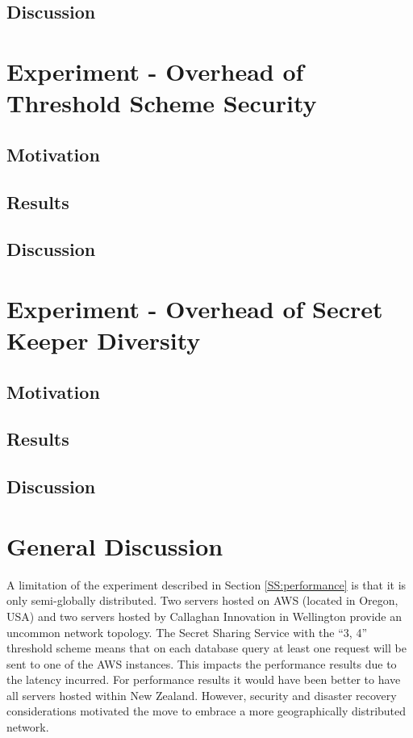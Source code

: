 \subsection{Discussion}

\section{Experiment  - Overhead of Threshold Scheme Security}

\subsection{Motivation}

\subsection{Results}

\subsection{Discussion}

\section{Experiment  - Overhead of Secret Keeper Diversity}

\subsection{Motivation}

\subsection{Results}

\subsection{Discussion}


\section{General Discussion}

A limitation of the experiment described in Section \ref{SS:performance} is that it is only semi-globally distributed. Two servers hosted on AWS (located in Oregon, USA) and two servers hosted by Callaghan Innovation in Wellington provide an uncommon network topology. The Secret Sharing Service with the ``3, 4'' threshold scheme means that on each database query at least one request will be sent to one of the AWS instances. This impacts the performance results due to the latency incurred. For performance results it would have been better to have all servers hosted within New Zealand. However, security and disaster recovery considerations motivated the move to embrace a more geographically distributed network.

